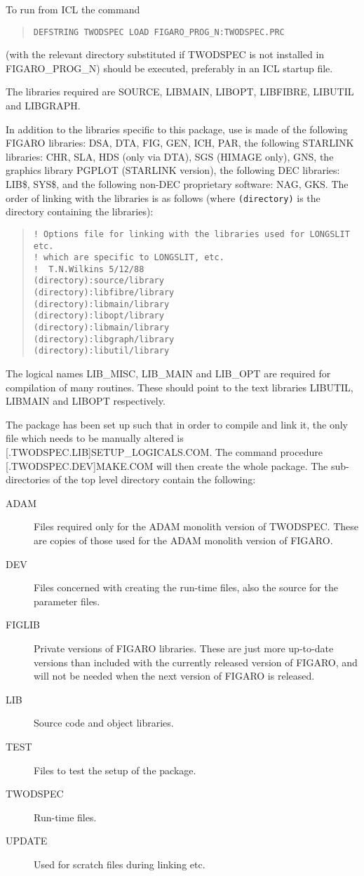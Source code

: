 To run from ICL the command
\begin{quote}\begin{verbatim}
DEFSTRING TWODSPEC LOAD FIGARO_PROG_N:TWODSPEC.PRC
\end{verbatim}\end{quote}
(with the relevant directory substituted if TWODSPEC is not installed in
FIGARO\_PROG\_N) should be executed, preferably in an ICL startup file.

The libraries required are SOURCE, LIBMAIN, LIBOPT, LIBFIBRE, LIBUTIL
and LIBGRAPH.

In addition to the libraries specific to this package, use is made of
the following FIGARO libraries: DSA, DTA, FIG, GEN, ICH, PAR, the
following STARLINK libraries: CHR, SLA, HDS (only via DTA), SGS (HIMAGE
only), GNS, the graphics library PGPLOT (STARLINK version), the
following DEC libraries: LIB\$, SYS\$, and the following non-DEC
proprietary software: NAG, GKS.
The order of linking with the libraries is as follows (where
{\tt (directory)} is the directory containing the libraries):

\begin{quote}\begin{verbatim}
! Options file for linking with the libraries used for LONGSLIT etc.
! which are specific to LONGSLIT, etc.
!  T.N.Wilkins 5/12/88
(directory):source/library
(directory):libfibre/library
(directory):libmain/library
(directory):libopt/library
(directory):libmain/library
(directory):libgraph/library
(directory):libutil/library
\end{verbatim}\end{quote}
The logical names LIB\_MISC, LIB\_MAIN and LIB\_OPT are required for
compilation of many routines. These should point to the text libraries
LIBUTIL, LIBMAIN and LIBOPT respectively.

The package has been set up such that in order to compile and link it,
the only file which needs to be manually altered is
[.TWODSPEC.LIB]SETUP\_LOGICALS.COM. The command procedure
[.TWODSPEC.DEV]MAKE.COM will then create the whole package.
The sub-directories of the top level directory contain the following:
\begin{description}
\item[ADAM] Files required only for the ADAM monolith version of
TWODSPEC.
These are copies of those used for the ADAM monolith version of FIGARO.
\item[DEV] Files concerned with creating the run-time files, also
the source for the parameter files.
\item[FIGLIB] Private versions of FIGARO libraries. These are just
more up-to-date versions than included with the currently released
version of FIGARO, and will not be needed when the next version of
FIGARO is released.
\item[LIB] Source code and object libraries.
\item[TEST] Files to test the setup of the package.
\item[TWODSPEC] Run-time files.
\item[UPDATE] Used for scratch files during linking etc.
\end{description}

